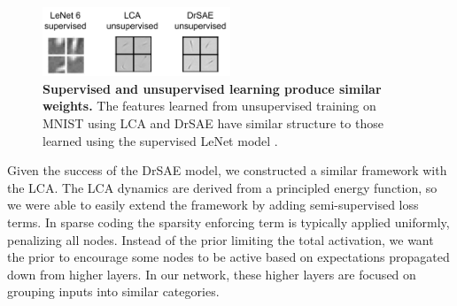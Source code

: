 \begin{figure}
    \centering
    \includegraphics[width=0.5\textwidth]{figures/lenet_lca_drsae_weights.png}
    \caption{\textbf{Supervised and unsupervised learning produce similar weights.} The features learned from unsupervised training on MNIST using LCA \parencite{rozell2008sparse} and DrSAE \parencite{rolfe2013discriminative} have similar structure to those learned using the supervised LeNet model \parencite{lecun1998gradient}.}
    \label{fig:ch3_lenet_lca_drsae_weights}
\end{figure}

Given the success of the DrSAE model, we constructed a similar framework with the LCA. The LCA dynamics are derived from a principled energy function, so we were able to easily extend the framework by adding semi-supervised loss terms. In sparse coding the sparsity enforcing term is typically applied uniformly, penalizing all nodes. Instead of the prior limiting the total activation, we want the prior to encourage some nodes to be active based on expectations propagated down from higher layers. In our network, these higher layers are focused on grouping inputs into similar categories.

